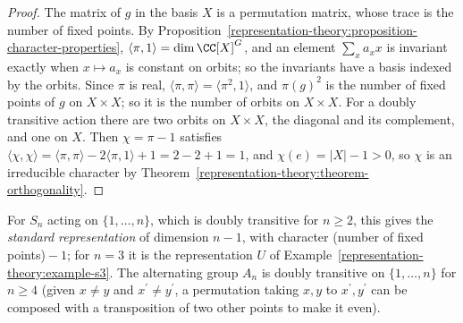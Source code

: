 \begin{proof}
The matrix of $g$ in the basis $X$ is a permutation matrix, whose trace is the number of fixed points. By Proposition~\ref{representation-theory:proposition-character-properties},
$\langle\pi, 1\rangle = \dim\CC[X]^G$, and an element $\sum_xa_xx$ is invariant exactly when $x \mapsto a_x$ is constant on orbits; so the invariants have a basis indexed by the
orbits. Since $\pi$ is real, $\langle\pi, \pi\rangle = \langle\pi^2, 1\rangle$, and $\pi(g)^2$ is the number of fixed points of $g$ on $X \times X$; so it is the number of orbits on
$X \times X$. For a doubly transitive action there are two orbits on $X \times X$, the diagonal and its complement, and one on $X$. Then $\chi = \pi - 1$ satisfies
$\langle\chi, \chi\rangle = \langle\pi, \pi\rangle - 2\langle\pi, 1\rangle + 1 = 2 - 2 + 1 = 1$, and $\chi(e) = |X| - 1 > 0$, so $\chi$ is an irreducible character by
Theorem~\ref{representation-theory:theorem-orthogonality}.
\end{proof}

For $S_n$ acting on $\{1, \ldots, n\}$, which is doubly transitive for $n \geq 2$, this gives the \emph{standard representation} of dimension $n - 1$, with character
(number of fixed points)${} - 1$; for $n = 3$ it is the representation $U$ of Example~\ref{representation-theory:example-s3}. The alternating group $A_n$ is doubly transitive
on $\{1, \ldots, n\}$ for $n \geq 4$ (given $x \neq y$ and $x^{\prime} \neq y^{\prime}$, a permutation taking $x, y$ to $x^{\prime}, y^{\prime}$ can be composed with a transposition of two other points to make
it even).

